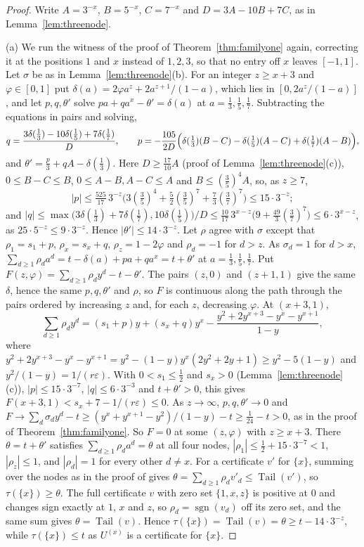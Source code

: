 \documentclass[11pt]{article}
\DeclareMathOperator{\Tail}{Tail}
\DeclareMathOperator{\sgn}{sgn}
\begin{document}
\begin{proof}
Write $A=3^{-x}$, $B=5^{-x}$, $C=7^{-x}$ and $D=3A-10B+7C$, as in
Lemma~\ref{lem:threenode}.

(a) We run the witness of the proof of Theorem~\ref{thm:familyone} again,
correcting it at the positions $1$ and $x$ instead of $1,2,3$, so that no
entry off $x$ leaves $[-1,1]$.  Let $\sigma$ be as in
Lemma~\ref{lem:threenode}(b).  For an integer $z\ge x+3$ and
$\varphi\in[0,1]$ put $\delta(a)=2\varphi a^z+2a^{z+1}/(1-a)$, which lies in
$[0,2a^z/(1-a)]$, and let $p,q,\theta'$ solve
$pa+qa^x-\theta'=\delta(a)$ at $a=\tfrac13,\tfrac15,\tfrac17$.  Subtracting
the equations in pairs and solving,
\[
  q=\frac{3\delta(\tfrac13)-10\delta(\tfrac15)+7\delta(\tfrac17)}{D},\qquad
  p=-\frac{105}{2D}\Bigl(\delta(\tfrac13)(B-C)-\delta(\tfrac15)(A-C)
  +\delta(\tfrac17)(A-B)\Bigr),
\]
and $\theta'=\tfrac p3+qA-\delta(\tfrac13)$.  Here $D\ge\tfrac{17}{10}A$
(proof of Lemma~\ref{lem:threenode}(c)), $0\le B-C\le B$,
$0\le A-B,A-C\le A$ and $B\le(\tfrac35)^4A$, so, as $z\ge7$,
\[
  |p|\le\tfrac{525}{17}\,3^{-z}\bigl(3(\tfrac35)^4+\tfrac52(\tfrac35)^7
  +\tfrac73(\tfrac37)^7\bigr)\le15\cdot3^{-z};
\]
and $|q|\le\max\bigl(3\delta(\tfrac13)+7\delta(\tfrac17),10\delta(\tfrac15)\bigr)/D
\le\tfrac{10}{17}\,3^{x-z}\bigl(9+\tfrac{49}3(\tfrac37)^7\bigr)\le6\cdot3^{x-z}$,
as $25\cdot5^{-z}\le9\cdot3^{-z}$.  Hence $|\theta'|\le14\cdot3^{-z}$.  Let
$\rho$ agree with $\sigma$ except that $\rho_1=s_1+p$, $\rho_x=s_x+q$,
$\rho_z=1-2\varphi$ and $\rho_d=-1$ for $d>z$.  As $\sigma_d=1$ for $d>x$,
$\sum_{d\ge1}\rho_da^d=t-\delta(a)+pa+qa^x=t+\theta'$ at
$a=\tfrac13,\tfrac15,\tfrac17$.  Put
$F(z,\varphi)=\sum_{d\ge1}\rho_dy^d-t-\theta'$.  The pairs $(z,0)$ and
$(z+1,1)$ give the same $\delta$, hence the same $p,q,\theta'$ and $\rho$,
so $F$ is continuous along the path through the pairs ordered by increasing
$z$ and, for each $z$, decreasing $\varphi$.  At $(x+3,1)$,
\[
  \sum_{d\ge1}\rho_dy^d=(s_1+p)y+(s_x+q)y^x
  -\frac{y^2+2y^{x+3}-y^x-y^{x+1}}{1-y},
\]
where $y^2+2y^{x+3}-y^x-y^{x+1}=y^2-(1-y)y^x(2y^2+2y+1)\ge y^2-5(1-y)$ and
$y^2/(1-y)=1/(r\varepsilon)$.  With $0<s_1\le\tfrac12$ and $s_x>0$
(Lemma~\ref{lem:threenode}(c)), $|p|\le15\cdot3^{-7}$, $|q|\le6\cdot3^{-3}$
and $t+\theta'>0$, this gives $F(x+3,1)<s_x+7-1/(r\varepsilon)\le0$.  As
$z\to\infty$, $p,q,\theta'\to0$ and
$F\to\sum_d\sigma_dy^d-t\ge(y^x+y^{x+1}-y^2)/(1-y)-t\ge\tfrac1{24}-t>0$, as in
the proof of Theorem~\ref{thm:familyone}.  So $F=0$ at some $(z,\varphi)$
with $z\ge x+3$.  There $\theta=t+\theta'$ satisfies
$\sum_{d\ge1}\rho_da^d=\theta$ at all four nodes,
$|\rho_1|\le\tfrac12+15\cdot3^{-7}<1$, $|\rho_z|\le1$, and $|\rho_d|=1$ for
every other $d\ne x$.  For a certificate $v'$ for $\{x\}$, summing over the
nodes as in the proof of \cite[Lemma~5.1]{coefficient-mass-attainment} gives
$\theta=\sum_{d\ge1}\rho_dv'_d\le\Tail(v')$, so $\tau(\{x\})\ge\theta$.  The
full certificate $v$ with zero set $\{1,x,z\}$ is positive at $0$ and
changes sign exactly at $1$, $x$ and $z$, so $\rho_d=\sgn(v_d)$ off its zero
set, and the same sum gives $\theta=\Tail(v)$.  Hence
$\tau(\{x\})=\Tail(v)=\theta\ge t-14\cdot3^{-z}$, while $\tau(\{x\})\le t$
as $U^{(x)}$ is a certificate for $\{x\}$.


\end{proof}
\end{document}
